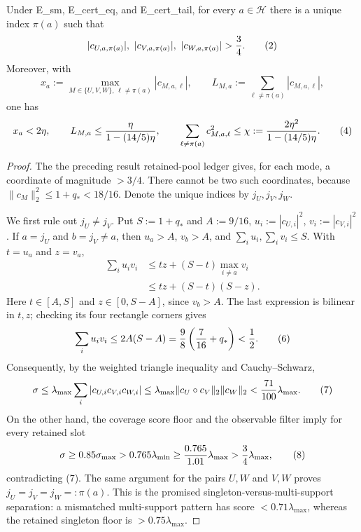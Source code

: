 \begin{proposition}\label{prop:step-006-support}
Under E\_sm, E\_cert\_eq, and E\_cert\_tail, for
every \(a\in\mathcal H\) there is a unique index \(\pi(a)\) such that
\[
 |c_{U,a,\pi(a)}|,\ |c_{V,a,\pi(a)}|,\ |c_{W,a,\pi(a)}|>{3\over4}. \tag{2}
\]
Moreover, with
\[
 x_a:=\max_{M\in\{U,V,W\},\,\ell\ne\pi(a)}|c_{M,a,\ell}|,\qquad
 L_{M,a}:=\sum_{\ell\ne\pi(a)}|c_{M,a,\ell}|, \tag{3}
\]
one has
\[
 x_a<2\eta,\qquad
 L_{M,a}\le {\eta\over1-(14/5)\eta},\qquad
 \sum_{\ell\ne\pi(a)}c_{M,a,\ell}^2
 \le \chi:= {2\eta^2\over1-(14/5)\eta}. \tag{4}
\]

\begin{proof}
The the preceding result retained-pool ledger gives, for each mode, a
coordinate of magnitude \(>3/4\). There cannot be two such coordinates,
because \(\|c_M\|_2^2\le1+q_*<18/16\). Denote the unique indices by
\(j_U,j_V,j_W\).

We first rule out \(j_U\ne j_V\). Put \(S:=1+q_*\) and \(A:=9/16\),
\(u_i:=|c_{U,i}|^2\), \(v_i:=|c_{V,i}|^2\). If \(a=j_U\) and
\(b=j_V\ne a\), then \(u_a>A\), \(v_b>A\), and
\(\sum_i u_i,\sum_i v_i\le S\). With \(t=u_a\) and \(z=v_a\),
\[
\begin{aligned}
 \sum_i u_i v_i
 &\le tz+(S-t)\max_{i\ne a}v_i\\
 &\le tz+(S-t)(S-z).
\end{aligned} \tag{5}
\]
Here \(t\in[A,S]\) and \(z\in[0,S-A]\), since \(v_b>A\). The last
expression is bilinear in \(t,z\); checking its four rectangle corners gives
\[
 \sum_i u_i v_i\le2A(S-A)
 ={9\over8}\left({7\over16}+q_*\right)<{1\over2}. \tag{6}
\]
Consequently, by the weighted triangle inequality and Cauchy--Schwarz,
\[
 \sigma
 \le\lambda_{\max}\sum_i|c_{U,i}c_{V,i}c_{W,i}|
 \le\lambda_{\max}\|c_U\circ c_V\|_2\|c_W\|_2
 <{71\over100}\lambda_{\max}. \tag{7}
\]
On the other hand, the coverage score floor and the observable filter imply
for every retained slot
\[
 \sigma\ge0.85\sigma_{\max}>0.765\lambda_{\min}
 \ge {0.765\over1.01}\lambda_{\max}>{3\over4}\lambda_{\max}, \tag{8}
\]
contradicting (7). The same argument for the pairs \(U,W\) and \(V,W\)
proves \(j_U=j_V=j_W=:\pi(a)\). This is the promised
singleton-versus-multi-support separation: a mismatched multi-support
pattern has score \(<0.71\lambda_{\max}\), whereas the retained singleton
floor is \(>0.75\lambda_{\max}\).


\end{proof}
\end{proposition}
